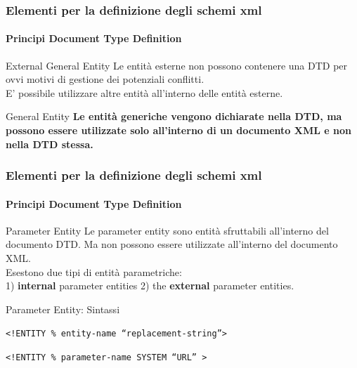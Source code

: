 \begin{frame}
    \frametitle{Elementi per la definizione degli schemi xml}
    \framesubtitle{Principi Document Type Definition}
    \addtocounter{nframe}{1}

    \begin{block}{External General Entity}
        Le entità esterne non possono contenere una DTD per ovvi motivi di gestione dei potenziali conflitti.
        \\E' possibile utilizzare altre entità all'interno delle entità esterne. 
    \end{block}

    \begin{block}{General Entity}
     \textbf{Le entità generiche vengono dichiarate nella DTD, ma possono essere utilizzate solo all'interno di un documento XML e non nella DTD stessa.}
    \end{block}
\end{frame}

\begin{frame}
    \frametitle{Elementi per la definizione degli schemi xml}
    \framesubtitle{Principi Document Type Definition}
    \addtocounter{nframe}{1}

    \begin{block}{Parameter Entity}
        Le parameter entity sono entità sfruttabili all'interno del documento DTD. Ma non possono essere utilizzate all'interno del documento XML.
        \\ Esestono due tipi di entità parametriche: 
        \\1) \textbf{internal}  parameter entities 2) the \textbf{external} parameter entities.
    \end{block}

    \begin{block}{Parameter Entity: Sintassi}
        \begin{center}\texttt{<!ENTITY \% entity-name ``replacement-string''>}\end{center}
        \begin{center}\texttt{<!ENTITY \% parameter-name SYSTEM ``URL'' >}\end{center}
    \end{block}
\end{frame}

